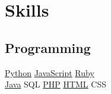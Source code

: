 \documentclass[]{joaosoares-resume}
\begin{document}
\begin{minipage}[t]{0.39\textwidth}




\section{Skills}

\subsection{Programming}
\href{http://www.python.org}{Python} \textbullet{}
\href{http://www.php.net}{JavaScript} \textbullet{}
\href{https://www.ruby-lang.org/}{Ruby} \\
\href{https://www.oracle.com/java/}{Java} \textbullet{}
SQL \textbullet{}
\href{http://www.php.net}{PHP} \textbullet{}
\href{https://www.w3schools.com/html/}{HTML} \textbullet{}
CSS  \\
\sectionsep


\end{minipage}
\end{document}
